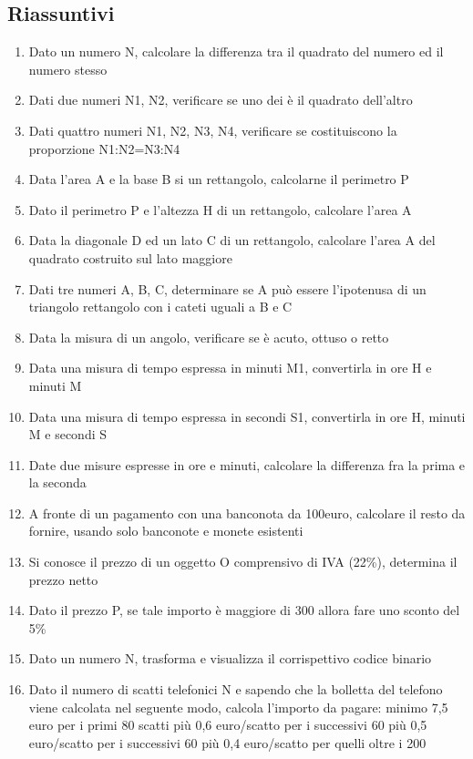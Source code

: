 \documentclass{article}
\begin{document}
	\subsection{Riassuntivi}
	\begin{enumerate}
		\item Dato un numero N, calcolare la differenza tra il quadrato del numero ed il numero stesso
		\item Dati due numeri N1, N2, verificare se uno dei è il quadrato dell'altro
		\item Dati quattro numeri N1, N2, N3, N4, verificare se costituiscono la proporzione N1:N2=N3:N4
		\item Data l'area A e la base B si un rettangolo, calcolarne il perimetro P
		\item Dato il perimetro P e l'altezza H di un rettangolo, calcolare l'area A
		\item Data la diagonale D ed un lato C di un rettangolo, calcolare l'area A del quadrato costruito sul lato maggiore
		\item Dati tre numeri A, B, C, determinare se A può essere l'ipotenusa di un triangolo rettangolo con i cateti uguali a B e C
		\item Data la misura di un angolo, verificare se è acuto, ottuso o retto
		\item Data una misura di tempo espressa in minuti M1, convertirla in ore H e minuti M
		\item Data una misura di tempo espressa in secondi S1, convertirla in ore H, minuti M e secondi S
		\item Date due misure espresse in ore e minuti, calcolare la differenza fra la prima e la seconda
		\item A fronte di un pagamento con una banconota da 100euro, calcolare il resto da fornire, usando solo banconote e monete esistenti
		\item Si conosce il prezzo di un oggetto O comprensivo di IVA (22\%), determina il prezzo netto
		\item Dato il prezzo P, se tale importo è maggiore di 300 allora fare uno sconto del 5\%
		\item Dato un numero N, trasforma e visualizza il corrispettivo codice binario
		\item Dato il numero di scatti telefonici N e sapendo che la bolletta del telefono viene calcolata nel seguente modo, calcola l'importo da pagare:
			\subitem minimo 7,5 euro per i primi 80 scatti
			\subitem più 0,6 euro/scatto per i successivi 60
			\subitem più 0,5 euro/scatto per i successivi 60
			\subitem più 0,4 euro/scatto per quelli oltre i 200
	\end{enumerate}
\end{document}

